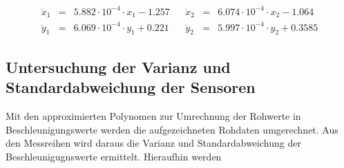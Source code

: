 \documentclass{article}
\begin{document}
\begin{equation}
\begin{array}{lclcclcl}
\ddot{x}_1 &=& 5.882 \cdot 10^{-4} \cdot x_1 - 1.257 & &
\ddot{x}_2 &=& 6.074 \cdot 10^{-4} \cdot x_2 - 1.064 \\
\ddot{y}_1 &=& 6.069 \cdot 10^{-4} \cdot y_1 + 0.221 & &
\ddot{y}_2 &=& 5.997 \cdot 10^{-4} \cdot y_2 + 0.3585
\end{array}
\end{equation}

\newpage
\subsection{Untersuchung der Varianz und Standardabweichung der Sensoren}
Mit den approximierten Polynomen zur Umrechnung der Rohwerte in Beschleunigungswerte werden die aufgezeichneten Rohdaten umgerechnet. Aus den Messreihen wird daraus die Varianz und Standardabweichung der Beschleunigugnswerte ermittelt. Hieraufhin werden 
\end{document}
